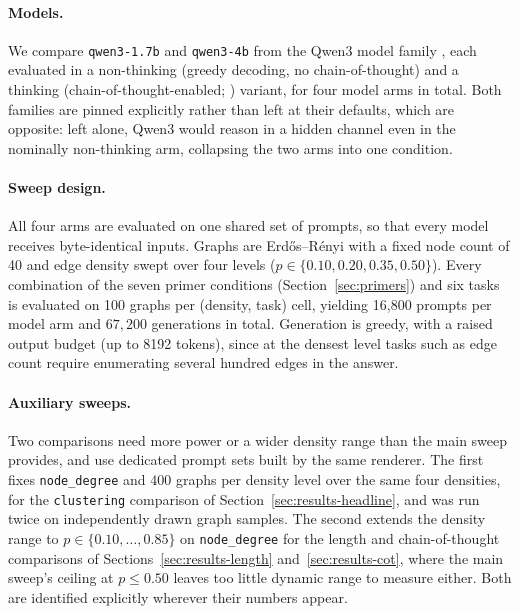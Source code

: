 \documentclass[11pt]{article}
\begin{document}
\paragraph{Models.} We compare \texttt{qwen3-1.7b} and \texttt{qwen3-4b}
from the Qwen3 model family \citep{qwen2025qwen3}, each evaluated in a
non-thinking (greedy decoding, no chain-of-thought) and a thinking
(chain-of-thought-enabled; \citealp{wei2022chainofthought}) variant, for
four model arms in total. Both families are pinned explicitly rather than
left at their defaults, which are opposite: left alone, Qwen3 would reason
in a hidden channel even in the nominally non-thinking arm, collapsing the
two arms into one condition.

\paragraph{Sweep design.} All four arms are evaluated on one shared set of
prompts, so that every model receives byte-identical inputs. Graphs are
Erd\H{o}s--R\'enyi \citep{erdosrenyi1959random} with a fixed node count of
40 and edge density swept over four levels ($p \in \{0.10, 0.20, 0.35,
0.50\}$). Every combination of the seven primer conditions
(Section~\ref{sec:primers}) and six tasks is evaluated on 100 graphs per
(density, task) cell, yielding 16{,}800 prompts per model arm and
$67{,}200$ generations in total. Generation is greedy, with a raised output
budget (up to 8192 tokens), since at the densest level tasks such as edge
count require enumerating several hundred edges in the answer.

\paragraph{Auxiliary sweeps.} Two comparisons need more power or a wider
density range than the main sweep provides, and use dedicated prompt sets
built by the same renderer. The first fixes \texttt{node\_degree} and
$400$ graphs per density level over the same four densities, for the
\texttt{clustering} comparison of Section~\ref{sec:results-headline}, and
was run twice on independently drawn graph samples. The second extends the
density range to $p \in \{0.10, \dots, 0.85\}$ on \texttt{node\_degree} for
the length and chain-of-thought comparisons of
Sections~\ref{sec:results-length} and~\ref{sec:results-cot}, where the main
sweep's ceiling at $p \le 0.50$ leaves too little dynamic range to measure
either. Both are identified explicitly wherever their numbers appear.
\end{document}
